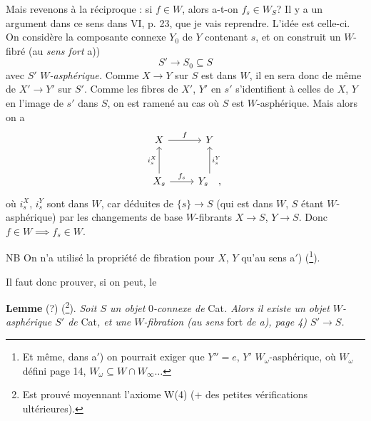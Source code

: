 \documentclass[11pt]{article}
\newcommand{\printedpage}[1]{\marginpar{\footnotesize p.~#1}}
\newcommand{\msp}[1]{\marginpar{\footnotesize [#1]}}
\begin{document}
Mais revenons à la réciproque : si $f \in W$, alors a-t-on $f_s \in W_S$? Il y a un argument dans ce sens dans VI, p. 23, que je vais reprendre. L'idée est celle-ci. On considère la composante connexe $Y_0$ de $Y$ contenant $s$, et on construit un
\msp{page 7}
$W$-fibré (au \textit{sens fort} a))
\[ S' \longrightarrow S_0 \subseteq S \]
avec $S'$ \textit{$W$-asphérique.} Comme $X \longrightarrow Y$ sur $S$ est dans $W$, il en sera donc de même de $X' \longrightarrow Y'$ sur $S'$. Comme les fibres de $X'$, $Y'$ en $s'$ s'identifient à celles de $X$, $Y$ en l'image de $s'$ dans $S$, on est ramené au cas où $S$ est $W$-asphérique. Mais alors on a
\[
\begin{tikzcd}[row sep=large]
X \arrow[r, "f"] & Y \\
X_s \arrow[u, "i_s^X"] \arrow[r, "f_s"] & Y_s \arrow[u, "i_s^Y"'] \quad ,
\end{tikzcd}
\]
\printedpage{7}
où $i_s^X$, $i_s^Y$ sont dans $W$, car déduites de $\{s\} \longrightarrow S$ (qui est dans $W$, $S$ étant $W$-asphérique) par les changements de base $W$-fibrants $X \longrightarrow S$, $Y \longrightarrow S$. Donc $f \in W \implies f_s \in W$.

NB On n'a utilisé la propriété de fibration pour $X$, $Y$ qu'au sens a$'$) (\footnote[10]{Et même, dans a$'$) on pourrait exiger que $Y'' = e$, $Y'$ $W_\omega$-asphérique, où $W_\omega$ défini page 14, $W_\omega \subseteq W \cap W_\infty \ldots$}).

Il faut donc prouver, si on peut, le

\textbf{Lemme} (?) (\footnote[11]{Est prouvé moyennant l'axiome W(4) (+ des petites vérifications ultérieures).}). \textit{Soit $S$ un objet} $0$\textit{-connexe de} Cat\textit{. Alors il existe un objet $W$-asphérique $S'$ de} Cat\textit{, et une $W$-fibration (au sens} fort \textit{de a), page 4) $S' \longrightarrow S$.}
\end{document}

